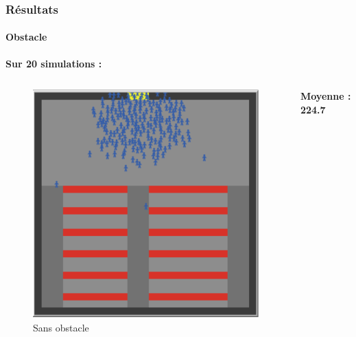 \documentclass[10pt]{beamer}
\begin{document}
\begin{frame}
	\frametitle{\textbf {\Large Résultats}}
	\framesubtitle{\normalsize Obstacle}
	
	\begin{center}
	\textbf{\normalsize Sur 20 simulations : }
	\end{center}
	
	
	\begin{columns}

			\begin{figure}
				\includegraphics[scale = 0.35]{capture_sans_obstacle.PNG}
				\caption{Sans obstacle}
 		
 				\label{pic: obstacle}
 			\end{figure}
		\hspace{4em}\textbf{Moyenne : 224.7}
 


\end{columns}
\end{frame}
\end{document}
